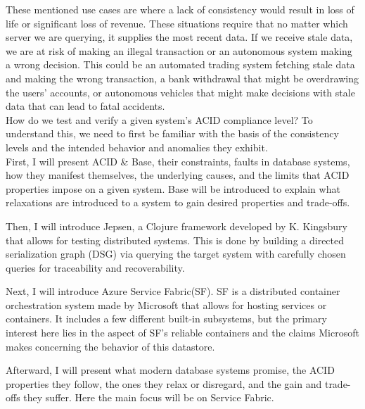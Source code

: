 \documentclass[a4paper,10pt,titlepage]{report}
\begin{document}
    These mentioned use cases are where a lack of consistency would result in loss of life or significant loss of revenue. These situations require that no matter which server we are querying, it supplies the most recent data. If we receive stale data, we are at risk of making an illegal transaction or an autonomous system making a wrong decision. This could be an automated trading system fetching stale data and making the wrong transaction, a bank withdrawal that might be overdrawing the users' accounts, or autonomous vehicles that might make decisions with stale data that can lead to fatal accidents. \\

    \vspace{5mm}
    How do we test and verify a given system's ACID compliance level? To understand this, we need to first be familiar with the basis of the consistency levels and the intended behavior and anomalies they exhibit.\\


    First, I will present ACID \& Base, their constraints, faults in database systems, how they manifest themselves, the underlying causes, and the limits that ACID properties impose on a given system. Base will be introduced to explain what relaxations are introduced to a system to gain desired properties and trade-offs.\\
    \vspace{5mm}

    Then, I will introduce Jepsen, a Clojure framework\cite{jepsonio} developed by K. Kingsbury that allows for testing distributed systems. This is done by building a directed serialization graph (DSG) via querying the target system with carefully chosen queries for traceability and recoverability.  \\
    \vspace{5mm}

    Next, I will introduce Azure Service Fabric(SF). SF is a distributed container orchestration system made by Microsoft that allows for hosting services or containers. It includes a few different built-in subsystems, but the primary interest here lies in the aspect of SF's reliable containers and the claims Microsoft makes concerning the behavior of this datastore.\\
    \vspace{5mm}

    Afterward, I will present what modern database systems promise, the ACID properties they follow, the ones they relax or disregard, and the gain and trade-offs they suffer. Here the main focus will be on Service Fabric.\\
    \vspace{5mm}
\end{document}
